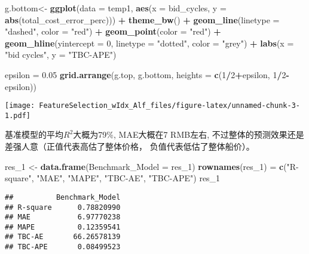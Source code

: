 \documentclass[]{article}
\newenvironment{Shaded}{\begin{snugshade}}{\end{snugshade}}
\newcommand{\KeywordTok}[1]{\textcolor[rgb]{0.13,0.29,0.53}{\textbf{#1}}}
\newcommand{\DataTypeTok}[1]{\textcolor[rgb]{0.13,0.29,0.53}{#1}}
\newcommand{\DecValTok}[1]{\textcolor[rgb]{0.00,0.00,0.81}{#1}}
\newcommand{\FloatTok}[1]{\textcolor[rgb]{0.00,0.00,0.81}{#1}}
\newcommand{\StringTok}[1]{\textcolor[rgb]{0.31,0.60,0.02}{#1}}
\newcommand{\OperatorTok}[1]{\textcolor[rgb]{0.81,0.36,0.00}{\textbf{#1}}}
\newcommand{\NormalTok}[1]{#1}
\begin{document}
\begin{Shaded}
\begin{Highlighting}[]
\NormalTok{g.bottom<-}\StringTok{ }\KeywordTok{ggplot}\NormalTok{(}\DataTypeTok{data =}\NormalTok{ temp1, }\KeywordTok{aes}\NormalTok{(}\DataTypeTok{x =}\NormalTok{ bid_cycles, }\DataTypeTok{y =} \KeywordTok{abs}\NormalTok{(total_cost_error_perc))) }\OperatorTok{+}
\StringTok{  }\KeywordTok{theme_bw}\NormalTok{() }\OperatorTok{+}\StringTok{ }\KeywordTok{geom_line}\NormalTok{(}\DataTypeTok{linetype =} \StringTok{"dashed"}\NormalTok{, }\DataTypeTok{color =} \StringTok{"red"}\NormalTok{) }\OperatorTok{+}\StringTok{ }\KeywordTok{geom_point}\NormalTok{(}\DataTypeTok{color =} \StringTok{"red"}\NormalTok{) }\OperatorTok{+}
\StringTok{  }\KeywordTok{geom_hline}\NormalTok{(}\DataTypeTok{yintercept =} \DecValTok{0}\NormalTok{, }\DataTypeTok{linetype =} \StringTok{"dotted"}\NormalTok{, }\DataTypeTok{color =} \StringTok{"grey"}\NormalTok{) }\OperatorTok{+}\StringTok{ }
\StringTok{  }\KeywordTok{labs}\NormalTok{(}\DataTypeTok{x =} \StringTok{"bid cycles"}\NormalTok{, }\DataTypeTok{y =} \StringTok{"TBC-APE"}\NormalTok{)}

\NormalTok{epsilon =}\StringTok{ }\FloatTok{0.05}
\KeywordTok{grid.arrange}\NormalTok{(g.top, g.bottom, }\DataTypeTok{heights =} \KeywordTok{c}\NormalTok{(}\DecValTok{1}\OperatorTok{/}\DecValTok{2}\OperatorTok{+}\NormalTok{epsilon, }\DecValTok{1}\OperatorTok{/}\DecValTok{2}\OperatorTok{-}\NormalTok{epsilon))}
\end{Highlighting}
\end{Shaded}

\texttt{[image: FeatureSelection\_wIdx\_Alf\_files/figure-latex/unnamed-chunk-3-1.pdf]}

基准模型的平均\(R^2\)大概为79\%, MAE大概在7 RMB左右,
不过整体的预测效果还是差强人意（正值代表高估了整体价格，
负值代表低估了整体船价）。

\begin{Shaded}
\begin{Highlighting}[]
\NormalTok{res_}\DecValTok{1}\NormalTok{ <-}\StringTok{ }\KeywordTok{data.frame}\NormalTok{(}\DataTypeTok{Benchmark_Model =}\NormalTok{ res_}\DecValTok{1}\NormalTok{)}
\KeywordTok{rownames}\NormalTok{(res_}\DecValTok{1}\NormalTok{) =}\StringTok{ }\KeywordTok{c}\NormalTok{(}\StringTok{"R-square"}\NormalTok{, }\StringTok{"MAE"}\NormalTok{, }\StringTok{"MAPE"}\NormalTok{, }\StringTok{"TBC-AE"}\NormalTok{, }\StringTok{"TBC-APE"}\NormalTok{)}
\NormalTok{res_}\DecValTok{1}
\end{Highlighting}
\end{Shaded}

\begin{verbatim}
##          Benchmark_Model
## R-square      0.78820990
## MAE           6.97770238
## MAPE          0.12359541
## TBC-AE       66.26578139
## TBC-APE       0.08499523
\end{verbatim}
\end{document}
